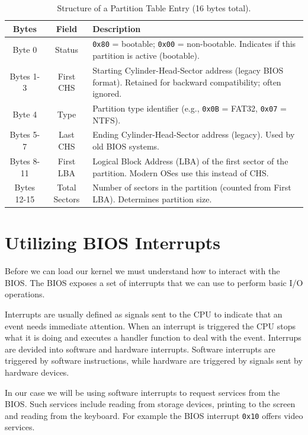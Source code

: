 \begin{table}[h]
    \centering
    \renewcommand{\arraystretch}{1.15}
    \setlength{\tabcolsep}{10pt}
    
    \begin{tabular}{|c|c|p{7cm}|}
    \hline
    \textbf{Bytes} & \textbf{Field} & \textbf{Description} \\
    \hline
    Byte 0 & Status & 
    \texttt{0x80} = bootable; \texttt{0x00} = non-bootable. Indicates if this partition is active (bootable). \\
    \hline
    Bytes 1-3 & First CHS & 
    Starting Cylinder-Head-Sector address (legacy BIOS format). Retained for backward compatibility; often ignored. \\
    \hline
    Byte 4 & Type & 
    Partition type identifier (e.g., \texttt{0x0B} = FAT32, \texttt{0x07} = NTFS). \\
    \hline
    Bytes 5-7 & Last CHS & 
    Ending Cylinder-Head-Sector address (legacy). Used by old BIOS systems. \\
    \hline
    Bytes 8-11 & First LBA & 
    Logical Block Address (LBA) of the first sector of the partition. Modern OSes use this instead of CHS. \\
    \hline
    Bytes 12-15 & Total Sectors & 
    Number of sectors in the partition (counted from First LBA). Determines partition size. \\
    \hline
    \end{tabular}
    \caption{Structure of a Partition Table Entry (16 bytes total).}
\end{table}

\section{Utilizing BIOS Interrupts}

Before we can load our kernel we must understand how to interact with the BIOS. The BIOS exposes a set of
interrupts that we can use to perform basic I/O operations.

Interrupts are usually defined as signals sent to the CPU to indicate that an event needs immediate attention.
When an interrupt is triggered the CPU stops what it is doing and executes a handler function to deal with the event.
Interrups are devided into software and hardware interrupts. Software interrupts are triggered by software instructions, 
while hardware are triggered by signals sent by hardware devices.

In our case we will be using software interrupts to request services from the BIOS. Such services include reading from
storage devices, printing to the screen and reading from the keyboard. For example the BIOS interrupt \texttt{0x10}
offers video services.

